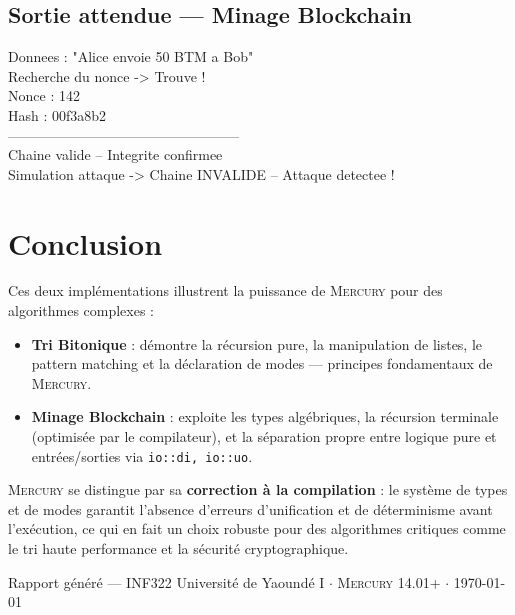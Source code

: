 \documentclass[12pt,a4paper]{article}
\newcommand{\mercury}{\textsc{Mercury}}
\newcommand{\code}[1]{\texttt{\color{keywordcolor}#1}}
\begin{document}
\subsection{Sortie attendue — Minage Blockchain}

\begin{tcolorbox} Donnees : "Alice envoie 50 BTM a Bob"\\
Recherche du nonce -> Trouve !\\
Nonce  : 142\\
Hash   : 00f3a8b2\\
--------------------------------------------------\\
Chaine valide -- Integrite confirmee\\
Simulation attaque -> Chaine INVALIDE -- Attaque detectee !
\end{tcolorbox}

\section{Conclusion}

Ces deux implémentations illustrent la puissance de \mercury{} pour des
algorithmes complexes :

\begin{itemize}
  \item \textbf{Tri Bitonique} : démontre la récursion pure, la manipulation
        de listes, le pattern matching et la déclaration de modes — principes
        fondamentaux de \mercury{}.

  \item \textbf{Minage Blockchain} : exploite les types algébriques, la
        récursion terminale (optimisée par le compilateur), et la séparation
        propre entre logique pure et entrées/sorties via \code{io::di, io::uo}.
\end{itemize}

\begin{resultbox}
\mercury{} se distingue par sa \textbf{correction à la compilation} : le
système de types et de modes garantit l'absence d'erreurs d'unification et
de déterminisme avant l'exécution, ce qui en fait un choix robuste pour des
algorithmes critiques comme le tri haute performance et la sécurité
cryptographique.
\end{resultbox}

\vfill
\begin{center}
  \small\color{gray}
  Rapport généré — INF322 Université de Yaoundé I $\cdot$
  \mercury{} 14.01+ $\cdot$
  \today
\end{center}
\end{document}
